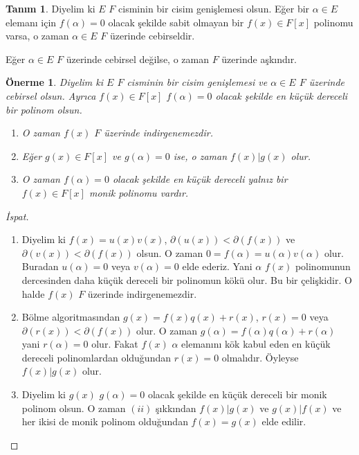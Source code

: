 \documentclass[draft]{article}
\newtheorem{prop}[thm]{Önerme}
\theoremstyle{definition}
\newtheorem{defn}{Tanım}[section]
\theoremstyle{remark}
\begin{document}
		    \begin{defn}
		        Diyelim ki $E$ $F$ cisminin bir cisim genişlemesi olsun. Eğer bir $\alpha \in E$ elemanı için $f(\alpha) = 0$ olacak şekilde sabit olmayan bir $f(x) \in F[x]$ polinomu varsa, o zaman $\alpha \in E$ $F$ üzerinde cebirseldir.\par
		        Eğer $\alpha \in E$ $F$ üzerinde cebirsel değilse, o zaman $F$ üzerinde aşkındır.
            \end{defn}
            
            \begin{prop}
                Diyelim ki $E$ $F$ cisminin bir cisim genişlemesi ve  $\alpha \in E$ $F$ üzerinde cebirsel olsun. Ayrıca $f(x) \in F[x]$ $f(\alpha) = 0$ olacak şekilde en küçük dereceli bir polinom olsun.
                \begin{enumerate}
                \renewcommand{\labelenumi}{(\roman{enumi})}
                    \item O zaman $f(x)$ $F$ üzerinde indirgenemezdir.
                    \item Eğer $g(x) \in F[x]$ ve $g(\alpha) = 0$ ise, o zaman $f(x) | g(x)$ olur.
                    \item O zaman $f(\alpha) = 0$ olacak şekilde en küçük dereceli yalnız bir $f(x) \in F[x]$ monik polinomu vardır.
                \end{enumerate}
            \end{prop}
            
            \begin{proof}[İspat]
                \begin{enumerate}
                \renewcommand{\labelenumi}{(\roman{enumi})}
                    \item Diyelim ki $f(x) = u(x)v(x)$, $\partial(u(x)) < \partial(f(x))$ ve $\partial(v(x)) < \partial(f(x))$ olsun. O zaman $0 = f(\alpha) = u(\alpha)v(\alpha)$ olur. Buradan $u(\alpha) = 0$ veya $v(\alpha) = 0$ elde ederiz. Yani $\alpha$ $f(x)$ polinomunun dercesinden daha küçük dereceli bir polinomun kökü olur. Bu bir çelişkidir. O halde $f(x)$ $F$ üzerinde indirgenemezdir.
                    \item Bölme algoritmasından $g(x) = f(x)q(x) + r(x)$, $r(x) = 0$ veya $\partial(r(x)) < \partial(f(x))$ olur. O zaman $g(\alpha) = f(\alpha)q(\alpha) + r(\alpha)$ yani $r(\alpha) = 0$ olur. Fakat $f(x)$ $\alpha$ elemanını kök kabul eden en küçük dereceli polinomlardan olduğundan $r(x) = 0$ olmalıdır. Öyleyse $f(x) | g(x)$ olur.
                    \item Diyelim ki $g(x)$ $g(\alpha) = 0$ olacak şekilde en küçük dereceli bir monik polinom olsun. O zaman $(ii)$ şıkkından $f(x) | g(x)$ ve $g(x) | f(x)$ ve her ikisi de monik polinom olduğundan $f(x) = g(x)$ elde edilir.
                    \end{enumerate}
            \end{proof}
            
\end{document}
